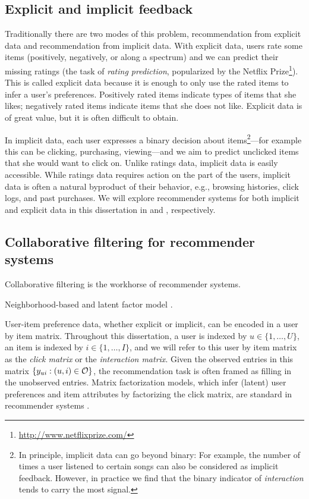 \subsection{Explicit and implicit feedback} \label{chpt:background:sec:data}

Traditionally there are two modes of this problem, recommendation from
explicit data and recommendation from implicit data.  With explicit
data, users rate some items (positively, negatively, or along a
spectrum) and we can predict their missing ratings (the task of \textit{rating prediction}, popularized by the Netflix Prize\footnote{\url{http://www.netflixprize.com/}}). This is called explicit data because it is enough to only use the rated items to infer a user's
preferences. Positively rated items indicate types of items that she
likes; negatively rated items indicate items that she does not like. Explicit data is of great value, but it is often difficult to obtain. 

In implicit data, each user expresses a binary decision about items\footnote{In principle, implicit data can go beyond binary: For example, the number of times a user listened to certain songs can also be considered as implicit feedback. However, in practice we find that the binary indicator of \textit{interaction} tends to carry the most signal. }---for
example this can be clicking, purchasing, viewing---and we aim to
predict unclicked items that she would want to click on. Unlike
ratings data, implicit data is easily accessible.  While ratings data
requires action on the part of the users, implicit data is often a
natural byproduct of their behavior, e.g., browsing histories, click
logs, and past purchases. We will explore recommender systems for both implicit and explicit data in this dissertation in  and , respectively.

\subsection{Collaborative filtering for recommender systems} \label{chpt:background:sec:cf}

\PP Collaborative filtering is the workhorse of recommender systems.

\PP Neighborhood-based \citep{sarwar2001item} and latent factor model \citep{koren2009matrix}.

 User-item preference data, whether explicit or implicit, can be encoded in a user by item matrix. Throughout this dissertation, a user is indexed by $u \in \{1, \dots, U\}$, an item is indexed by $i \in \{1, \dots, I\}$, and we will refer to this user by item matrix as the \emph{click matrix} or the \emph{interaction matrix}. Given the observed entries in this matrix $\{y_{ui}: (u, i) \in \mathcal{O}\}$, the recommendation task is often framed as filling in the unobserved entries.  Matrix factorization models, which infer (latent) user preferences and item attributes by factorizing the click matrix, are standard in recommender systems \citep{koren2009matrix}. 

